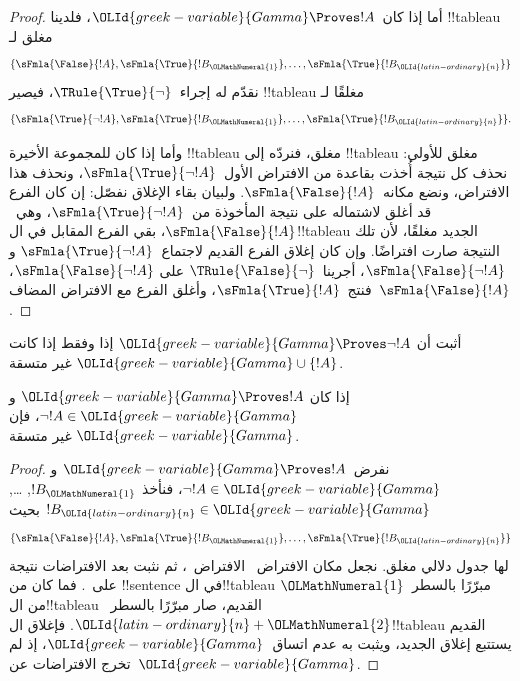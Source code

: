 \documentclass[../../../include/open-logic-section]{subfiles}
\begin{document}
\begin{proof}
أما إذا كان~${\OLId{greek-variable}{Gamma}} \Proves !A$، فلدينا !!{tableau} مغلق لـ
\[
\{\sFmla{\False}{!A},
\sFmla{\True}{!B_{\OLMathNumeral{1}}}, \dots, \sFmla{\True}{!B_{\OLId{latin-ordinary}{n}}}\}
\]
نقدّم له إجراء~$\TRule{\True}{\lnot}$، فيصير !!{tableau} مغلقًا لـ
\[
\{\sFmla{\True}{\lnot !A},
\sFmla{\True}{!B_{\OLMathNumeral{1}}}, \dots, \sFmla{\True}{!B_{\OLId{latin-ordinary}{n}}}\}.
\]

وأما إذا كان للمجموعة الأخيرة !!{tableau} مغلق، فنردّه إلى
!!{tableau} مغلق للأولى: نحذف كل نتيجة أُخذت بقاعدة
\TRule{\True}{\lnot} من الافتراض الأول~$\sFmla{\True}{\lnot !A}$،
ونحذف هذا الافتراض، ونضع مكانه~$\sFmla{\False}{!A}$.
ولبيان بقاء الإغلاق نفصّل: إن كان الفرع قد أغلق لاشتماله على نتيجة
\TRule{\True}{\lnot} المأخوذة من~$\sFmla{\True}{\lnot !A}$،
وهي~$\sFmla{\False}{!A}$، بقي الفرع المقابل في ال!!{tableau} الجديد
مغلقًا، لأن تلك النتيجة صارت افتراضًا. وإن كان إغلاق الفرع القديم
لاجتماع~$\sFmla{\True}{\lnot !A}$ و$\sFmla{\False}{\lnot
  !A}$، أجرينا~$\TRule{\False}{\lnot}$ على
$\sFmla{\False}{\lnot !A}$، فنتج~$\sFmla{\True}{!A}$،
وأغلق الفرع مع الافتراض المضاف~$\sFmla{\False}{!A}$.
\end{proof}

\begin{prob}
أثبت أن ${\OLId{greek-variable}{Gamma}} \Proves \lnot !A$ إذا وفقط إذا كانت ${\OLId{greek-variable}{Gamma}} \cup \{!A\}$ غير متسقة.
\end{prob}

\begin{prop}
  إذا كان ${\OLId{greek-variable}{Gamma}} \Proves !A$ و$\lnot !A \in {\OLId{greek-variable}{Gamma}}$، فإن ${\OLId{greek-variable}{Gamma}}$
  غير متسقة.
\end{prop}

\begin{proof}
  نفرض~${\OLId{greek-variable}{Gamma}} \Proves !A$ و$\lnot !A \in {\OLId{greek-variable}{Gamma}}$، فنأخذ
  $!B_{\OLMathNumeral{1}}$, \dots, $!B_{\OLId{latin-ordinary}{n}} \in {\OLId{greek-variable}{Gamma}}$ بحيث
  \[
  \{\sFmla{\False}{!A}, \sFmla{\True}{!B_{\OLMathNumeral{1}}}, \dots, \sFmla{\True}{!B_{\OLId{latin-ordinary}{n}}}\}
  \]
  لها جدول دلالي مغلق. نجعل مكان الافتراض~
  الافتراض~، ثم نثبت بعد الافتراضات نتيجة
  \TRule{\True}{\lnot} على~.
  فما كان من !!{sentence} في ال!!{tableau} مبرّرًا بالسطر~${\OLMathNumeral{1}}$
  من ال!!{tableau} القديم، صار مبرّرًا بالسطر~${\OLId{latin-ordinary}{n}}+{\OLMathNumeral{2}}$.
  فإغلاق ال!!{tableau} القديم يستتبع إغلاق الجديد، ويثبت به عدم
  اتساق~${\OLId{greek-variable}{Gamma}}$، إذ لم تخرج الافتراضات عن~${\OLId{greek-variable}{Gamma}}$.
\end{proof}
\end{document}
